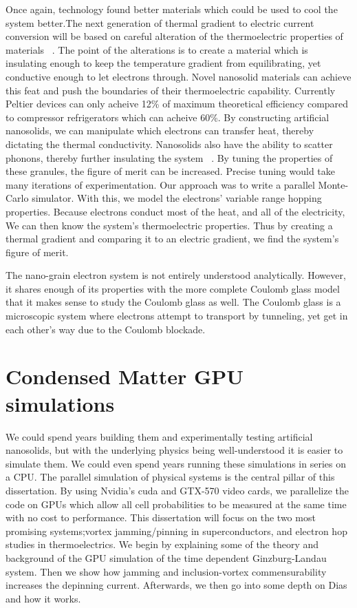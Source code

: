 Once again, technology found better materials which could be used to cool the system better.The next generation of thermal gradient to electric current conversion will be based on careful alteration of the thermoelectric properties of materials ~\cite{Sparks16}. The point of the alterations is to create a material which is insulating enough to keep the temperature gradient from equilibrating, yet conductive enough to let electrons through. Novel nanosolid materials can achieve this feat and push the boundaries of their thermoelectric capability. Currently Peltier devices can only acheive 12\% of maximum theoretical efficiency compared to compressor refrigerators which can acheive 60\%. By constructing artificial nanosolids, we can manipulate which electrons can transfer heat, thereby dictating the thermal conductivity. Nanosolids also have the ability to scatter phonons, thereby further insulating the system ~\cite{glatz09}. By tuning the properties of these granules, the figure of merit can be increased. Precise tuning would take many iterations of experimentation. Our approach was to write a parallel Monte-Carlo simulator. With this, we model the electrons' variable range hopping properties. Because electrons conduct most of the heat, and all of the electricity, We can then know the system's thermoelectric properties. Thus by creating a thermal gradient and comparing it to an electric gradient, we find the system's figure of merit. 

The nano-grain electron system is not entirely understood analytically. However, it shares enough of its properties with the more complete Coulomb glass model that it makes sense to study the Coulomb glass as well. The Coulomb glass is a microscopic system where electrons attempt to transport by tunneling, yet get in each other's way due to the Coulomb blockade. 

\section{Condensed Matter GPU simulations}
 We could spend years building them and experimentally testing artificial nanosolids, but with the underlying physics being well-understood it is easier to simulate them.  We could even spend years running these simulations in series on a CPU. The parallel simulation of physical systems is the central pillar of this dissertation.  By using Nvidia's {\sc cuda} and GTX-570 video cards, we parallelize the code on GPUs which allow all cell probabilities to be measured at the same time with no cost to performance. This dissertation will focus on the two most promising systems;vortex jamming/pinning in superconductors, and electron hop studies in thermoelectrics. We begin by explaining some of the theory and background of the GPU simulation of the time dependent Ginzburg-Landau system. Then we show how jamming and inclusion-vortex commensurability increases the depinning current. Afterwards, we then go into some depth on Dias and how it works. 

